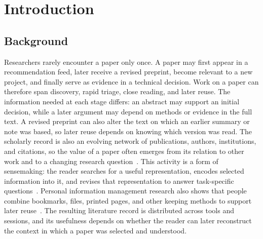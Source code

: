 ﻿%

\chapter{Introduction}


\section{Background}

Researchers rarely encounter a paper only once.
A paper may first appear in a recommendation feed, later receive a revised preprint, become relevant to a new project, and finally serve as evidence in a technical decision.
Work on a paper can therefore span discovery, rapid triage, close reading, and later reuse.
The information needed at each stage differs: an abstract may support an initial decision, while a later argument may depend on methods or evidence in the full text.
A revised preprint can also alter the text on which an earlier summary or note was based, so later reuse depends on knowing which version was read.
The scholarly record is also an evolving network of publications, authors, institutions, and citations, so the value of a paper often emerges from its relation to other work and to a changing research question~\cite{fortunato2018science}.
This activity is a form of sensemaking: the reader searches for a useful representation, encodes selected information into it, and revises that representation to answer task-specific questions~\cite{russell1993sensemaking}.
Personal information management research also shows that people combine bookmarks, files, printed pages, and other keeping methods to support later reuse~\cite{jones2002keeping}.
The resulting literature record is distributed across tools and sessions, and its usefulness depends on whether the reader can later reconstruct the context in which a paper was selected and understood.

